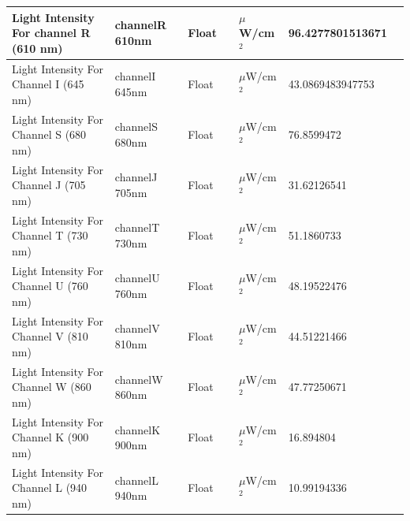 \documentclass[12pt]{article}
\begin{document}
     \begin{table}[H]
            	 \label{t:dataFormatas7265x}
            	\small
            	\begin{tabular}{||p{2cm}| p{2cm}|p{2cm}|p{1.5cm}|p{1.5cm}|p{2cm}|p{2cm}||}
            		\hline
                        \hline
            		  Light \hbox{Intensity} For channel R (610 nm) & channelR 610nm & Float & 
                       & $\mu$W/cm$^{2}$ & \tiny 96.4277801513671 &   \\
                     \hline
            		Light \hbox{Intensity} For Channel I (645 nm) & channelI 645nm & Float & 
                       & $\mu$W/cm$^{2}$ & \tiny 43.0869483947753 &   \\
                    \hline
            		  Light \hbox{Intensity} For Channel S (680 nm) & channelS 680nm  & Float & 
                       & $\mu$W/cm$^{2}$ & \tiny 76.8599472 &   \\
                    \hline
            		Light \hbox{Intensity} For Channel J (705 nm) & channelJ 705nm  & Float  & 
                       & $\mu$W/cm$^{2}$ & \tiny  31.62126541 &   \\
                    \hline
                        Light \hbox{Intensity} For Channel T (730 nm) &  channelT 730nm & Float  & 
                       & $\mu$W/cm$^{2}$ & \tiny  51.1860733 &   \\
                       \hline
                        Light \hbox{Intensity} For Channel U (760 nm) & channelU 760nm  & Float  & 
                       & $\mu$W/cm$^{2}$ & \tiny 48.19522476 &   \\
                       \hline
                        Light \hbox{Intensity} For Channel V (810 nm) & channelV 810nm  & Float  & 
                       & $\mu$W/cm$^{2}$ & \tiny 44.51221466 &   \\
                       \hline
                        Light \hbox{Intensity} For Channel W (860 nm) & channelW 860nm  & Float  & 
                       & $\mu$W/cm$^{2}$ & \tiny 47.77250671 &   \\ 
                       \hline
                        Light \hbox{Intensity} For Channel K (900 nm) & channelK 900nm  & Float  & 
                       & $\mu$W/cm$^{2}$ & \tiny 16.894804 &   \\ 
                       \hline
                        Light \hbox{Intensity} For Channel L (940 nm) & channelL 940nm  & Float  & 
                       & $\mu$W/cm$^{2}$ & \tiny 10.99194336 &   \\ 
                       
                       
            		\hline
                    \hline
            	\end{tabular}
    \end{table} 
\clearpage
\end{document}
